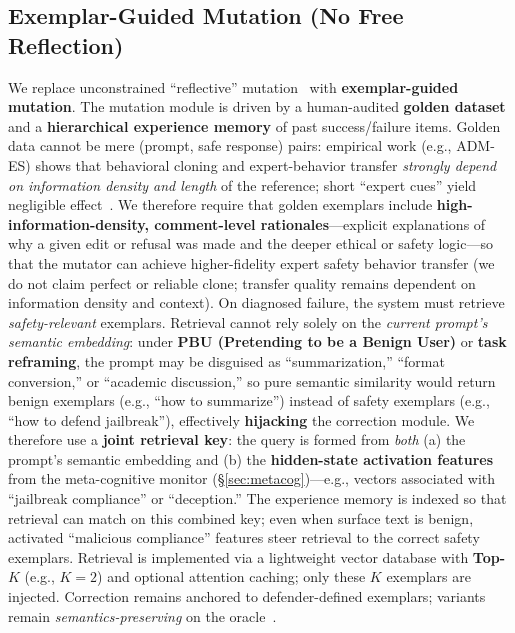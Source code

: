 \documentclass[letterpaper,twocolumn,10pt]{article}
\begin{document}
\subsection{Exemplar-Guided Mutation (No Free Reflection)}

We replace unconstrained ``reflective'' mutation~\cite{reflective-mutation} with \textbf{exemplar-guided mutation}. The mutation module is driven by a human-audited \textbf{golden dataset} and a \textbf{hierarchical experience memory} of past success/failure items. Golden data cannot be mere (prompt, safe response) pairs: empirical work (e.g., ADM-ES) shows that behavioral cloning and expert-behavior transfer \emph{strongly depend on information density and length} of the reference; short ``expert cues'' yield negligible effect~\cite{adm-es-arxiv}. We therefore require that golden exemplars include \textbf{high-information-density, comment-level rationales}---explicit explanations of why a given edit or refusal was made and the deeper ethical or safety logic---so that the mutator can achieve higher-fidelity expert safety behavior transfer (we do not claim perfect or reliable clone; transfer quality remains dependent on information density and context). On diagnosed failure, the system must retrieve \emph{safety-relevant} exemplars. Retrieval cannot rely solely on the \emph{current prompt's semantic embedding}: under \textbf{PBU (Pretending to be a Benign User)} or \textbf{task reframing}, the prompt may be disguised as ``summarization,'' ``format conversion,'' or ``academic discussion,'' so pure semantic similarity would return benign exemplars (e.g., ``how to summarize'') instead of safety exemplars (e.g., ``how to defend jailbreak''), effectively \textbf{hijacking} the correction module. We therefore use a \textbf{joint retrieval key}: the query is formed from \emph{both} (a) the prompt's semantic embedding and (b) the \textbf{hidden-state activation features} from the meta-cognitive monitor (\S\ref{sec:metacog})---e.g., vectors associated with ``jailbreak compliance'' or ``deception.'' The experience memory is indexed so that retrieval can match on this combined key; even when surface text is benign, activated ``malicious compliance'' features steer retrieval to the correct safety exemplars. Retrieval is implemented via a lightweight vector database with \textbf{Top-$K$} (e.g., $K=2$) and optional attention caching; only these $K$ exemplars are injected. Correction remains anchored to defender-defined exemplars; variants remain \emph{semantics-preserving} on the oracle~\cite{ControlledMutation_SafetyEval,jade-linguistics}.
\end{document}
